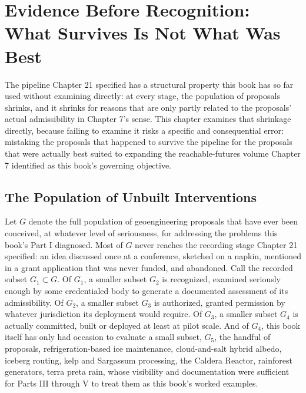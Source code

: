 \documentclass[11pt,oneside]{book}
\begin{document}
\chapter{Evidence Before Recognition: What Survives Is Not What Was Best}

The pipeline Chapter 21 specified has a structural property this book has so far used without examining directly: at every stage, the population of proposals shrinks, and it shrinks for reasons that are only partly related to the proposals' actual admissibility in Chapter 7's sense. This chapter examines that shrinkage directly, because failing to examine it risks a specific and consequential error: mistaking the proposals that happened to survive the pipeline for the proposals that were actually best suited to expanding the reachable-futures volume Chapter 7 identified as this book's governing objective.

\section*{The Population of Unbuilt Interventions}

Let $G$ denote the full population of geoengineering proposals that have ever been conceived, at whatever level of seriousness, for addressing the problems this book's Part I diagnosed. Most of $G$ never reaches the recording stage Chapter 21 specified: an idea discussed once at a conference, sketched on a napkin, mentioned in a grant application that was never funded, and abandoned. Call the recorded subset $G_1 \subset G$. Of $G_1$, a smaller subset $G_2$ is recognized, examined seriously enough by some credentialed body to generate a documented assessment of its admissibility. Of $G_2$, a smaller subset $G_3$ is authorized, granted permission by whatever jurisdiction its deployment would require. Of $G_3$, a smaller subset $G_4$ is actually committed, built or deployed at least at pilot scale. And of $G_4$, this book itself has only had occasion to evaluate a small subset, $G_5$, the handful of proposals, refrigeration-based ice maintenance, cloud-and-salt hybrid albedo, iceberg routing, kelp and Sargassum processing, the Caldera Reactor, rainforest generators, terra preta rain, whose visibility and documentation were sufficient for Parts III through V to treat them as this book's worked examples.
\end{document}
